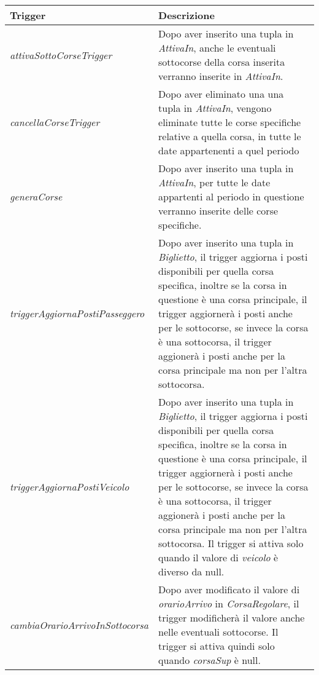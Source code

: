\begin{longtable}{|| m{} | m{} ||}
    \hline\hline
     \textbf{Trigger} & \textbf{Descrizione} \\ [1ex]
     \hline\hline
     \endfirsthead

      \textit{attivaSottoCorseTrigger} & Dopo aver inserito una tupla in \textit{AttivaIn}, anche le eventuali sottocorse della corsa inserita verranno inserite in \textit{AttivaIn}. \\ [1ex]
      \hline

      \textit{cancellaCorseTrigger} & Dopo aver eliminato una una tupla in \textit{AttivaIn}, vengono eliminate tutte le corse specifiche relative a quella corsa, in tutte le date appartenenti a quel periodo \\ [1ex]
      \hline

      \textit{generaCorse} & Dopo aver inserito una tupla in \textit{AttivaIn}, per tutte le date appartenti al periodo in questione verranno inserite delle corse specifiche. \\ [1ex]
      \hline

      \textit{triggerAggiornaPostiPasseggero} & Dopo aver inserito una tupla in \textit{Biglietto}, il trigger aggiorna i posti disponibili per quella corsa specifica, inoltre se la corsa in questione è una corsa principale, il trigger aggiornerà i posti anche per le sottocorse, se invece la corsa è una sottocorsa, il trigger aggionerà i posti anche per la corsa principale ma non per l'altra sottocorsa. \\ [1ex]
      \hline

      \textit{triggerAggiornaPostiVeicolo} & Dopo aver inserito una tupla in \textit{Biglietto}, il trigger aggiorna i posti disponibili per quella corsa specifica, inoltre se la corsa in questione è una corsa principale, il trigger aggiornerà i posti anche per le sottocorse, se invece la corsa è una sottocorsa, il trigger aggionerà i posti anche per la corsa principale ma non per l'altra sottocorsa. Il trigger si attiva solo quando il valore di \textit{veicolo} è diverso da null. \\ [1ex]
      \hline

      \textit{cambiaOrarioArrivoInSottocorsa} & Dopo aver modificato il valore di \textit{orarioArrivo} in \textit{CorsaRegolare}, il trigger modificherà il valore anche nelle eventuali sottocorse. Il trigger si attiva quindi solo quando \textit{corsaSup} è null. \\ [1ex]
      \hline


\end{longtable}
